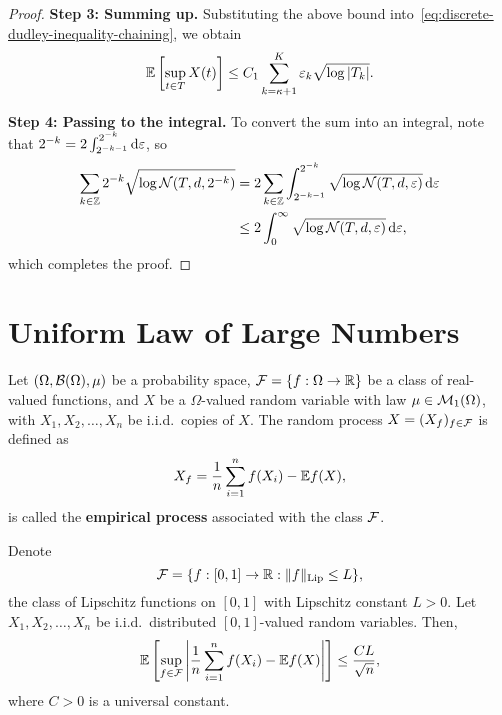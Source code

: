 \begin{proof}
	\textbf{Step 3: Summing up.} Substituting the above bound into~\eqref{eq:discrete-dudley-inequality-chaining}, we obtain
	\begin{equation*}
		\mathbb{E}\left[\sup_{t\in T}X(t)\right]\leq C_{1}\sum_{k=\kappa+1}^{K}\varepsilon_{k}\sqrt{\log |T_{k}|}.
	\end{equation*}


	\textbf{Step 4: Passing to the integral.} To convert the sum into an integral, note that \(2^{-k}=2\int_{2^{-k-1}}^{2^{-k}}\mathop{}\!\mathrm{d}\varepsilon\), so
	\begin{align*}
		\sum_{k\in\mathbb{Z}}2^{-k}\sqrt{\log\mathcal{N}(T,d,2^{-k})}
		 & = 2\sum_{k\in\mathbb{Z}}\int_{2^{-k-1}}^{2^{-k}}\sqrt{\log\mathcal{N}(T,d,\varepsilon)}\mathop{}\!\mathrm{d}\varepsilon \\
		 & \leq 2\int_{0}^{\infty}\sqrt{\log\mathcal{N}(T,d,\varepsilon)}\mathop{}\!\mathrm{d}\varepsilon,
	\end{align*}
	which completes the proof.
\end{proof}

\section{Uniform Law of Large Numbers}

\begin{definition}\label{def:empirical-process}
	Let \((\Omega,\mathcal{B}(\Omega),\mu)\) be a probability space, \(\mathcal{F}=\{f:\Omega\to\mathbb{R}\}\) be a class of real-valued functions, and \(X\) be a \(\Omega\)-valued random variable with law \(\mu\in\mathcal{M}_{1}(\Omega)\), with \(X_{1},X_{2},\ldots,X_{n}\) be i.i.d.\ copies of \(X\). The random process \(X=(X_{f})_{f\in\mathcal{F}}\) is defined as
	\begin{equation*}
		X_{f}=\frac{1}{n}\sum_{i=1}^{n}f(X_{i})-\mathbb{E} f(X),
	\end{equation*}
	is called the \textbf{empirical process} associated with the class \(\mathcal{F}\).
\end{definition}

\begin{theorem}
	Denote
	\begin{equation*}
		\mathcal{F}=\{f:[0,1]\to\mathbb{R}:\|f\|_{\text{Lip}}\leq L\},
	\end{equation*}
	the class of Lipschitz functions on \([0,1]\) with Lipschitz constant \(L>0\). Let \(X_{1},X_{2},\ldots,X_{n}\) be i.i.d.\ distributed \([0,1]\)-valued random variables. Then,
	\begin{equation*}
		\mathbb{E}\left[\sup_{f\in\mathcal{F}}\left|\frac{1}{n}\sum_{i=1}^{n}f(X_{i})-\mathbb{E} f(X)\right|\right]\leq\frac{CL}{\sqrt{n}},
	\end{equation*}
	where \(C>0\) is a universal constant.
\end{theorem}

